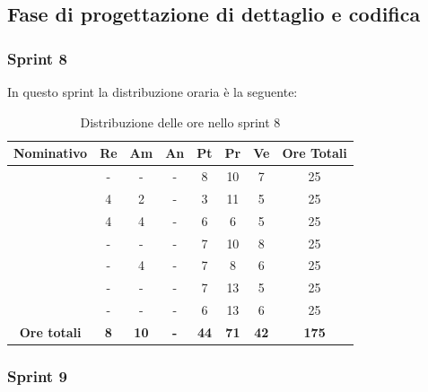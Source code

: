 \subsection{Fase di progettazione di dettaglio e codifica}

\subsubsection{Sprint 8}

In questo sprint la distribuzione oraria è la seguente:
\begin{table}[H]
		\begin{center}
			\setlength{\aboverulesep}{0pt}
			\setlength{\belowrulesep}{0pt}
			\setlength{\extrarowheight}{.75ex}
			\begin{tabular}{ c c c c c c c c }
				\rowcolor{AzzurroGruppo!30} 
				\textbf{Nominativo} & \textbf{Re} & \textbf{Am} & \textbf{An} & \textbf{Pt} & \textbf{Pr} & \textbf{Ve} & \textbf{Ore Totali}  \\
				\toprule
				\Davide    & - & - & - & 8 & 10 & 7 & 25 \\
				\Giosue    & 4 & 2 & - & 3 & 11 & 5 & 25 \\
				\Francesco & 4 & 4 & - & 6 & 6 & 5 & 25 \\
				\Daniele   & - & - & - & 7 & 10 & 8 & 25 \\
				\Lucrezia  & - & 4 & - & 7 & 8 & 6 & 25 \\
				\Matteo    & - & - & - & 7 & 13 & 5 & 25 \\
				\Tommaso   & - & - & - & 6 & 13 & 6 & 25 \\
				 \textbf{Ore totali} & \textbf{8} & \textbf{10} & \textbf{-} & \textbf{44} & \textbf{71} & \textbf{42} & \textbf{175} \\
				\bottomrule
			\end{tabular}
			\caption{Distribuzione delle ore nello sprint 8}
		\end{center}
	\end{table}


\subsubsection{Sprint 9}

